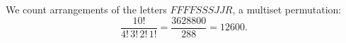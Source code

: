 We count arrangements of the letters $FFFFSSSJJR$, a multiset permutation:
\[\dfrac{10!}{4!\,3!\,2!\,1!}=\dfrac{3628800}{288}=\boxed{12600}.\]
